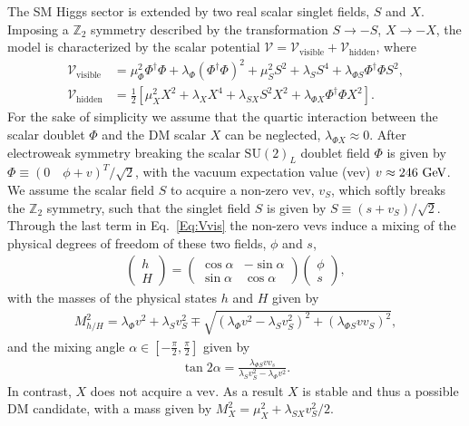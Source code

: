 \documentclass[../report.tex]{subfiles}
\begin{document}
The SM Higgs sector is extended by two real scalar singlet fields, $S$ and $X$. Imposing a $\mathbb{Z}_2$ symmetry described by the transformation $S\to -S$, $X\to -X$, the model is characterized by the scalar potential $\mathcal{V} = \mathcal{V}_\mathrm{visible}  + \mathcal{V}_\mathrm{hidden}$, where
\begin{align}
\label{Eq:Vvis}\mathcal{V}_\mathrm{visible} &=   \mu_{\Phi}^2 \Phi^\dagger \Phi + \lambda_\Phi (\Phi^\dagger \Phi)^2 + \mu_S^2 S^2 + \lambda_S S^4 + \lambda_{\Phi S} \Phi^\dagger \Phi S^2,\\
\label{Eq:Vhid} \mathcal{V}_\mathrm{hidden} &= \frac{1}{2}\left[\mu^2_{X} X^2 + \lambda_X X^4 + \lambda_{SX} S^2 X^2 + \lambda_{\Phi X} \Phi^\dagger \Phi X^2\right]. 
\end{align}
For the sake of simplicity we assume that the quartic interaction between the scalar doublet $\Phi$ and the DM scalar $X$ can be neglected, $\lambda_{\Phi X} \approx 0$. After electroweak symmetry breaking the scalar $\mathrm{SU}(2)_L$ doublet field $\Phi$ is given by 
$\Phi \equiv \left(0 \quad \phi + v\right)^T/\sqrt{2}$, with the vacuum expectation value (vev) $v \approx 246~\text{GeV}$. 
We assume the scalar field $S$ to acquire a non-zero vev, $v_S$, which softly breaks the $\mathbb{Z}_2$ symmetry, such that the singlet field $S$ is given by $S \equiv (s + v_S)/\sqrt{2}$. Through the last term in Eq.~\eqref{Eq:Vvis} the non-zero vevs induce a mixing of the physical degrees of freedom of these two fields, $\phi$ and $s$,
\begin{align}
\begin{pmatrix} h \\ H \end{pmatrix} = \begin{pmatrix} \cos \alpha & -\sin\alpha \\ \sin\alpha & \cos\alpha \end{pmatrix} \begin{pmatrix} \phi \\ s \end{pmatrix},
\end{align}
with the masses of the physical states $h$ and $H$ given by
\begin{align}
M_{h/H}^2 = \lambda_\Phi v^2 + \lambda_S v_S^2 \mp \sqrt{\left(\lambda_\Phi v^2 - \lambda_S v_S^2\right)^2 + \left(\lambda_{\Phi S} v v_S\right)^2},
\end{align}
and the mixing angle $\alpha \in [-\tfrac{\pi}{2}, \tfrac{\pi}{2}]$ given by
\begin{align}
\tan 2\alpha = \frac{\lambda_{\Phi S} v v_s}{\lambda_S v_S^2 - \lambda_\Phi v^2}.
\end{align}
In contrast, $X$ does not acquire a vev. As a result $X$ is stable and thus a possible DM candidate, with a mass given by
$M_X^2  = \mu_X^2  + \lambda_{SX} v_S^2/2$.
\end{document}
